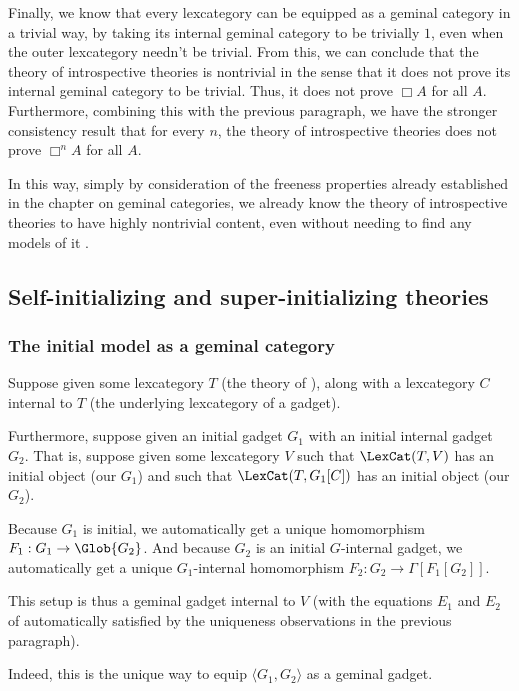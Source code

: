 Finally, we know that every lexcategory can be equipped as a geminal category in a trivial way, by taking its internal geminal category to be trivially $1$, even when the outer lexcategory needn't be trivial. From this, we can conclude that the theory of introspective theories is nontrivial in the sense that it does not prove its internal geminal category to be trivial. Thus, it does not prove $\Box A$ for all $A$. Furthermore, combining this with the previous paragraph, we have the stronger consistency result that for every $n$, the theory of introspective theories does not prove $\Box^n A$ for all $A$.

In this way, simply by consideration of the freeness properties already established in the chapter on geminal categories, we already know the theory of introspective theories to have highly nontrivial content, even without needing to find any models of it .


\subsection{Self-initializing and super-initializing theories}

\subsubsection{The initial model as a geminal category}
\begin{construction}\label{InitoGeminalYieldsGeminal}
Suppose given some lexcategory $T$ (the theory of ), along with a lexcategory $C$ internal to $T$ (the underlying lexcategory of a gadget).

Furthermore, suppose given an initial gadget $G_1$ with an initial internal gadget $G_2$. That is, suppose given some lexcategory $V$ such that $\LexCat(T, V)$ has an initial object (our $G_1$) and such that $\LexCat(T, G_1[C])$ has an initial object (our $G_2$).

Because $G_1$ is initial, we automatically get a unique homomorphism $F_1 : G_1 \to \Glob{G_2}$. And because $G_2$ is an initial $G$-internal gadget, we automatically get a unique $G_1$-internal homomorphism $F_2 : G_2 \to \Gamma[F_1[G_2]]$.

This setup is thus a geminal gadget internal to $V$ (with the equations $E_1$ and $E_2$ of  automatically satisfied by the uniqueness observations in the previous paragraph).

Indeed, this is the unique way to equip $\langle G_1, G_2 \rangle$ as a geminal gadget.
\end{construction}

